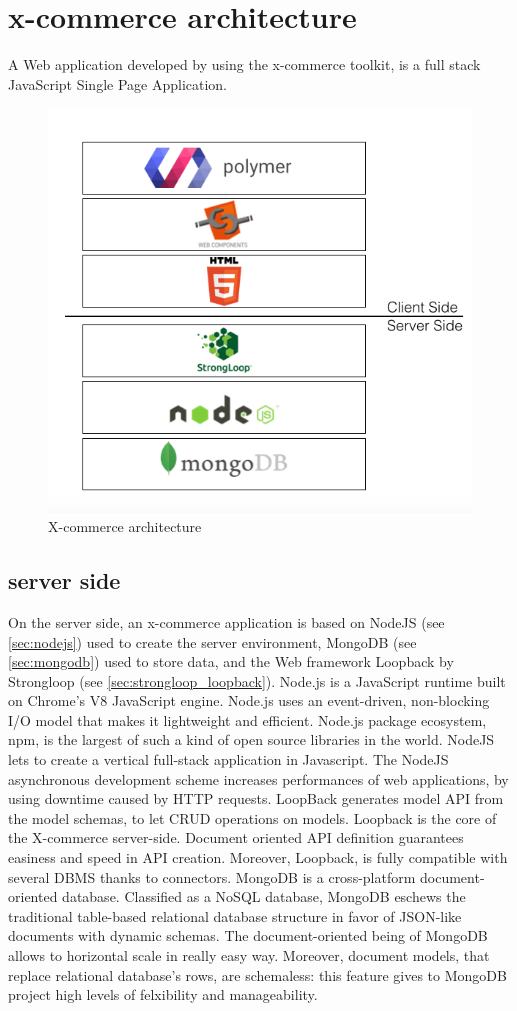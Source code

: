 \section{x-commerce architecture}
\label{sec:x_commerce_architecture}
A Web application developed by using the x-commerce toolkit, is a full stack JavaScript Single Page Application.
\begin{figure}[htb]
\centering
\includegraphics[width=0.7\linewidth]{images/chapter4/XPR_stack.png}\hfill
\caption[X-commerce architecture]{X-commerce architecture}
\label{fig:x_commerce_architecture}
\end{figure}
\subsection{server side}
On the server side, an x-commerce application is based on NodeJS (see \ref{sec:nodejs}) used to create the server environment, MongoDB (see \ref{sec:mongodb}) used to store data, and the Web framework Loopback by Strongloop (see \ref{sec:strongloop_loopback}).
\newline
Node.js is a JavaScript runtime built on Chrome’s V8 JavaScript engine. Node.js uses an event-driven, non-blocking I/O model that makes it lightweight and efficient. Node.js package ecosystem, npm, is the largest of such a kind of open source libraries in the world. NodeJS lets to create a vertical full-stack application in Javascript. The NodeJS asynchronous development scheme increases performances of web applications, by using downtime caused by HTTP requests.
\newline
LoopBack generates model API from the model schemas, to let CRUD operations on models. Loopback is the core of the X-commerce server-side. Document oriented API definition guarantees easiness and speed in API creation. Moreover, Loopback, is fully compatible with several DBMS thanks to connectors.
\newline
MongoDB is a cross-platform document-oriented database. Classified as a NoSQL database, MongoDB eschews the traditional table-based relational database structure in favor of JSON-like documents with dynamic schemas. The document-oriented being of MongoDB allows to horizontal scale in really easy way. Moreover, document models, that replace relational database’s rows, are schemaless: this feature gives to MongoDB project high levels of felxibility and manageability.
